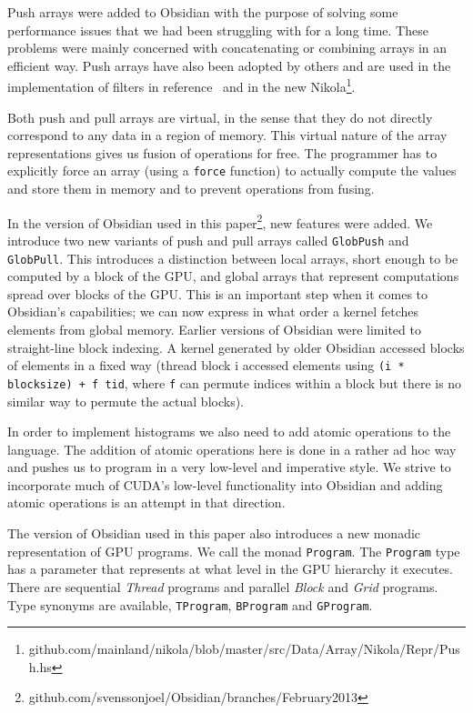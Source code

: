 Push arrays were added to Obsidian with the purpose of solving some performance 
issues that we had been struggling with for a long time. These problems were 
mainly concerned with concatenating or combining arrays in an efficient way.
Push arrays have also been adopted by others and are used in the implementation 
of filters in reference~ and in the new Nikola\footnote{github.com/mainland/nikola/blob/master/src/Data/Array/Nikola/Repr/Push.hs}.

Both push and pull arrays are virtual, in the sense that they do not directly 
correspond to any data in a region of memory. This virtual nature of the array 
representations gives us fusion of operations for free. The programmer has 
to explicitly force an array (using a {\tt force} function) to actually compute 
the values and store them in memory and to prevent operations from fusing. 

In the version of Obsidian used in this paper\footnote{github.com/svenssonjoel/Obsidian/branches/February2013}, new features were added.  We 
introduce two new variants of push and pull arrays called {\tt GlobPush} and 
{\tt GlobPull}. This introduces a distinction between local arrays, short 
enough to be computed by a block of the GPU, and global arrays that represent 
computations spread over blocks of the GPU. This is an important step when 
it comes to Obsidian's capabilities; we can now express in what order a kernel
fetches elements from global memory. 
Earlier versions of Obsidian were limited to straight-line block indexing. A kernel 
generated by older Obsidian accessed blocks of elements in a fixed way (thread block 
i accessed elements using {\tt (i * blocksize) + f tid}, where {\tt f} can permute 
indices within a block but there is no similar way to permute the actual blocks). 

In order to implement histograms we also need to add  atomic operations to the language. The addition of atomic operations here is 
done in a rather ad hoc way and pushes us to program in a very low-level and 
imperative style. We strive to incorporate much of CUDA's low-level functionality 
into Obsidian and adding atomic operations is an attempt in that 
direction.  

The version of Obsidian used in this paper also introduces a new monadic representation 
of GPU programs. We call the monad {\tt Program}. The {\tt Program} type has a 
parameter that represents at what level in the GPU hierarchy it executes. There 
are sequential {\em Thread} programs and parallel {\em Block} and {\em Grid} programs. Type synonyms 
are available, {\tt TProgram}, {\tt BProgram} and {\tt GProgram}.   


